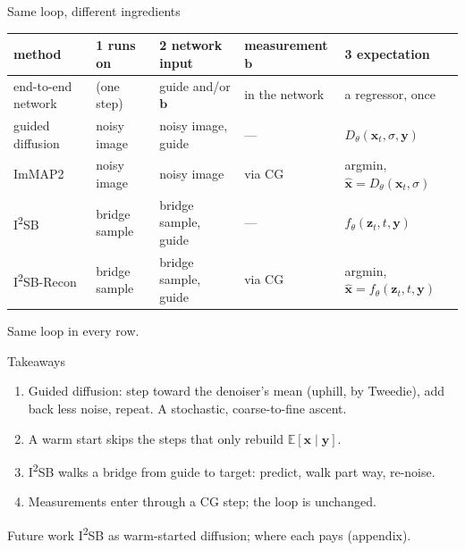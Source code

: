 \documentclass[aspectratio=169, 11pt]{beamer}
\newcommand{\x}{\bm{x}}
\newcommand{\y}{\bm{y}}
\newcommand{\z}{\bm{z}}
\newcommand{\hx}{\hat{\bm{x}}}
\newcommand{\E}{\mathbb{E}}
\begin{document}
\begin{frame}{Same loop, different ingredients}
\centering
\footnotesize
\renewcommand{\arraystretch}{1.1}
\begin{tabular}{@{}>{\raggedright\arraybackslash}p{2.5cm}>{\raggedright\arraybackslash}p{2.0cm}%
                >{\raggedright\arraybackslash}p{2.9cm}>{\raggedright\arraybackslash}p{1.7cm}%
                >{\raggedright\arraybackslash}p{3.3cm}@{}}
\toprule
method & \textbf{1} runs on & \textbf{2} network input & measurement $\bm b$ &
  \textbf{3} expectation \\
\midrule
end-to-end network & (one step) & guide and/or $\bm b$ & in the network &
  a regressor, once \\
guided diffusion & noisy image & noisy image, guide & --- & $D_\theta(\x_t,\sigma,\y)$ \\
ImMAP2 & noisy image & noisy image & via CG & argmin, $\hx = D_\theta(\x_t,\sigma)$ \\
I\textsuperscript{2}SB & bridge sample & bridge sample, guide & --- & $f_\theta(\z_t,t,\y)$ \\
I\textsuperscript{2}SB-Recon & bridge sample & bridge sample, guide & via CG &
  argmin, $\hx = f_\theta(\z_t,t,\y)$ \\
\bottomrule
\end{tabular}

\bigskip
\raggedright
\small
Same loop in every row.
\end{frame}

\begin{frame}{Takeaways}
\begin{enumerate}
  \setlength{\itemsep}{8pt}
  \item Guided diffusion: step toward the denoiser's mean (uphill, by Tweedie), add back less
        noise, repeat. A stochastic, coarse-to-fine ascent.
  \item A warm start skips the steps that only rebuild $\E[\x\mid\y]$.
  \item I\textsuperscript{2}SB walks a bridge from guide to target: predict, walk part way,
        re-noise.
  \item Measurements enter through a CG step; the loop is unchanged.
\end{enumerate}

\bigskip
\begin{block}{Future work}
I\textsuperscript{2}SB as warm-started diffusion; where each pays (appendix).
\end{block}
\end{frame}
\end{document}
